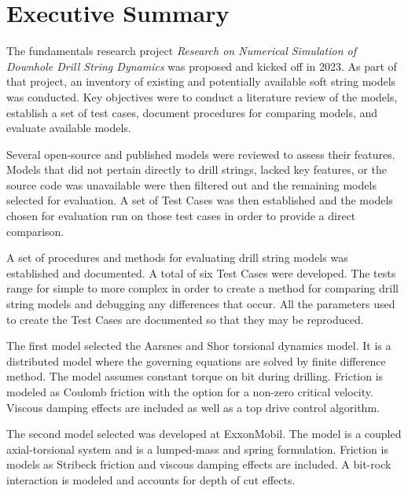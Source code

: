 \chapter*{Executive Summary}

The fundamentals research project \emph{Research on Numerical Simulation of Downhole Drill String Dynamics} was proposed and kicked off in 2023.  As part of that project, an inventory of existing and potentially available soft string models was conducted.  Key objectives were to conduct a literature review of the models, establish a set of test cases, document procedures for comparing models, and evaluate available models.

Several open-source and published models were reviewed to assess their features.  Models that did not pertain directly to drill strings, lacked key features, or the source code was unavailable were then filtered out and the remaining models selected for evaluation.  A set of Test Cases was then established and the models chosen for evaluation run on those test cases in order to provide a direct comparison.

A set of procedures and methods for evaluating drill string models was established and documented.  A total of six Test Cases were developed.  The tests range for simple to more complex in order to create a method for comparing drill string models and debugging any differences that occur.  All the parameters used to create the Test Cases are documented so that they may be reproduced.

The first model selected the Aarsnes and Shor torsional dynamics model. It is a distributed model where the governing equations are solved by finite difference method. The model assumes constant torque on bit during drilling.  Friction is modeled as Coulomb friction with the option for a non-zero critical velocity.  Viscous damping effects are included as well as a top drive control algorithm.

The second model selected was developed at ExxonMobil. The model is a coupled axial-torsional system and is a lumped-mass and spring formulation. Friction is models as Stribeck friction and viscous damping effects are included.  A bit-rock interaction is modeled and accounts for depth of cut effects.


